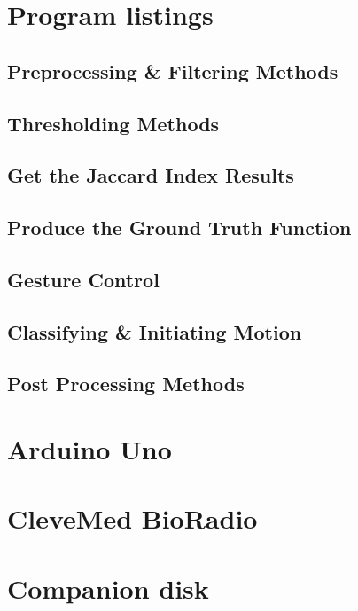 \documentclass[12pt,openany,a4paper]{book}
\begin{document}
\chapter{Program listings}

\section{Preprocessing \& Filtering Methods}
%

\section{Thresholding Methods}
%

\section{Get the Jaccard Index Results}
%

\section{Produce the Ground Truth Function}
%

\section{Gesture Control}
%

\section{Classifying \& Initiating Motion}
%

\section{Post Processing Methods}
%

\chapter{Arduino Uno}
%

\chapter{CleveMed BioRadio}
%

\chapter{Companion disk}
%


\end{document}
